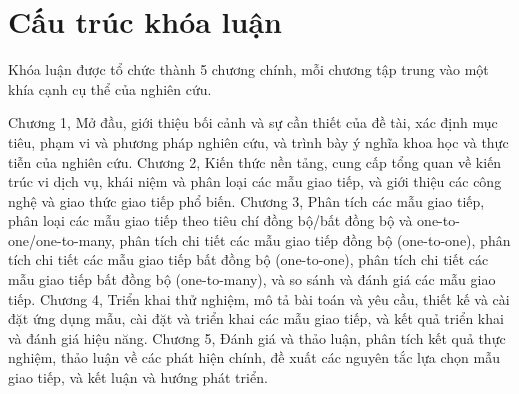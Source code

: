 \section{Cấu trúc khóa luận}
Khóa luận được tổ chức thành 5 chương chính, mỗi chương tập trung vào một khía cạnh cụ thể của nghiên cứu. 

Chương 1, Mở đầu, giới thiệu bối
cảnh và sự cần thiết của đề tài, xác định mục tiêu, phạm vi và phương pháp
nghiên cứu, và trình bày ý nghĩa khoa học và thực tiễn của nghiên cứu. Chương 2, Kiến thức nền tảng, cung cấp tổng quan về kiến trúc vi dịch vụ, khái niệm và
phân loại các mẫu giao tiếp, và giới thiệu các công nghệ và giao thức giao tiếp
phổ biến. Chương 3, Phân tích các mẫu giao tiếp, phân loại các mẫu giao tiếp
theo tiêu chí đồng bộ/bất đồng bộ và one-to-one/one-to-many, phân tích chi tiết
các mẫu giao tiếp đồng bộ (one-to-one), phân tích chi tiết các mẫu giao tiếp
bất đồng bộ (one-to-one), phân tích chi tiết các mẫu giao tiếp bất đồng bộ
(one-to-many), và so sánh và đánh giá các mẫu giao tiếp. Chương 4, Triển khai
thử nghiệm, mô tả bài toán và yêu cầu, thiết kế và cài đặt ứng dụng mẫu, cài
đặt và triển khai các mẫu giao tiếp, và kết quả triển khai và đánh giá hiệu
năng. Chương 5, Đánh giá và thảo luận, phân tích kết quả thực nghiệm, thảo luận
về các phát hiện chính, đề xuất các nguyên tắc lựa chọn mẫu giao tiếp, và kết
luận và hướng phát triển.